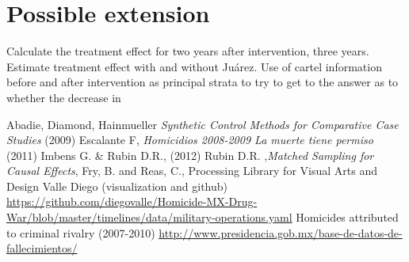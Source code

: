 \documentclass{article}[11 pt]
\begin{document}
\newpage
\section{Possible extension}
Calculate the treatment effect for two years after intervention, three years. Estimate treatment effect with and without Ju\'{a}rez.
Use of cartel information before and after intervention as principal strata to try to get to the answer as to whether the decrease in 


        \begin{thebibliography}{99}
           Abadie, Diamond, Hainmueller  \emph{Synthetic Control Methods for Comparative Case Studies} (2009)
           Escalante F, \emph{Homicidios 2008-2009 La muerte tiene permiso} (2011)
           Imbens G. \& Rubin D.R., (2012)
           Rubin D.R. ,\emph{Matched Sampling for Causal Effects},
 Fry, B. and Reas, C., Processing Library for Visual Arts and Design
            Valle Diego (visualization and github) \url{https://github.com/diegovalle/Homicide-MX-Drug-War/blob/master/timelines/data/military-operations.yaml}
		Homicides attributed to criminal rivalry (2007-2010)
	\url{http://www.presidencia.gob.mx/base-de-datos-de-fallecimientos/}          
\end{thebibliography}

\end{document}
